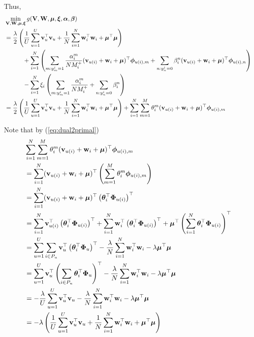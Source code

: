Thus, 
\begin{equation*}
\begin{aligned}
&\min_{\mathbf{V}, \mathbf{W}, \bm{\mu}, \bm{\xi}} g(\mathbf{V}, \mathbf{W}, \bm{\mu}, \bm{\xi}, {\bm{\alpha}}, {\bm{\beta}}) \\
&= \frac{\lambda}{2} \left( \frac{1}{U} \sum_{u=1}^U \mathbf{v}_u^\top \mathbf{v}_u 
     + \frac{1}{N} \sum_{i=1}^N \mathbf{w}_i^\top \mathbf{w}_i + \bm{\mu}^\top \bm{\mu} \right) \\
& \hspace{3em}
     + \sum_{i=1}^N \left( 
       \sum_{m: y_m^i = 1} \frac{\alpha_i^m}{N M_i^+} (\mathbf{v}_{u(i)} + \mathbf{w}_i + \bm{\mu})^\top \bm{\phi}_{u(i),m} 
     + \sum_{n: y_n^i = 0} \beta_i^n (\mathbf{v}_{u(i)} + \mathbf{w}_i + \bm{\mu})^\top \bm{\phi}_{u(i),n} \right) \\
& \hspace{3em}
     - \sum_{i=1}^N \xi_i \left( \sum_{m: y_m^i = 1} \frac{\alpha_i^m}{N M_i^+} + \sum_{n: y_n^i = 0} \beta_i^n \right) \\
&= \frac{\lambda}{2} \left( \frac{1}{U} \sum_{u=1}^U \mathbf{v}_u^\top \mathbf{v}_u 
     + \frac{1}{N} \sum_{i=1}^N \mathbf{w}_i^\top \mathbf{w}_i + \bm{\mu}^\top \bm{\mu} \right)
     + \sum_{i=1}^N \sum_{m=1}^M \theta_i^m (\mathbf{v}_{u(i)} + \mathbf{w}_i + \bm{\mu})^\top \bm{\phi}_{u(i),m}
\end{aligned}
\end{equation*}

Note that by (\ref{eq:dual2primal})
\begin{equation*}
\begin{aligned}
&\sum_{i=1}^N \sum_{m=1}^M \theta_i^m (\mathbf{v}_{u(i)} + \mathbf{w}_i + \bm{\mu})^\top \bm{\phi}_{u(i),m} \\
&= \sum_{i=1}^N (\mathbf{v}_{u(i)} + \mathbf{w}_i + \bm{\mu})^\top \left( \sum_{m=1}^M \theta_i^m \bm{\phi}_{u(i),m} \right) \\
&= \sum_{i=1}^N (\mathbf{v}_{u(i)} + \mathbf{w}_i + \bm{\mu})^\top \left( \bm{\theta}_i^\top \mathbf{\Phi}_{u(i)} \right)^\top \\
&= \sum_{i=1}^N \mathbf{v}_{u(i)}^\top \left( \bm{\theta}_i^\top \mathbf{\Phi}_{u(i)} \right)^\top 
     + \sum_{i=1}^N \mathbf{w}_i^\top \left( \bm{\theta}_i^\top \mathbf{\Phi}_{u(i)} \right)^\top 
     + \bm{\mu}^\top \left( \sum_{i=1}^N \bm{\theta}_i^\top \mathbf{\Phi}_{u(i)} \right)^\top \\
&= \sum_{u=1}^U \sum_{i \in P_u} \mathbf{v}_u^\top \left( \bm{\theta}_i^\top \mathbf{\Phi}_u \right)^\top
     - \frac{\lambda}{N} \sum_{i=1}^N \mathbf{w}_i^\top \mathbf{w}_i 
     - \lambda \bm{\mu}^\top \bm{\mu} \\
&= \sum_{u=1}^U \mathbf{v}_u^\top \left( \sum_{i \in P_u} \bm{\theta}_i^\top \mathbf{\Phi}_u \right)^\top
     - \frac{\lambda}{N} \sum_{i=1}^N \mathbf{w}_i^\top \mathbf{w}_i 
     - \lambda \bm{\mu}^\top \bm{\mu} \\
&= -\frac{\lambda}{U} \sum_{u=1}^U \mathbf{v}_u^\top \mathbf{v}_u
     - \frac{\lambda}{N} \sum_{i=1}^N \mathbf{w}_i^\top \mathbf{w}_i 
     - \lambda \bm{\mu}^\top \bm{\mu} \\
&= -\lambda \left( \frac{1}{U} \sum_{u=1}^U \mathbf{v}_u^\top \mathbf{v}_u
     + \frac{1}{N} \sum_{i=1}^N \mathbf{w}_i^\top \mathbf{w}_i 
     + \bm{\mu}^\top \bm{\mu} \right)
\end{aligned}
\end{equation*}

